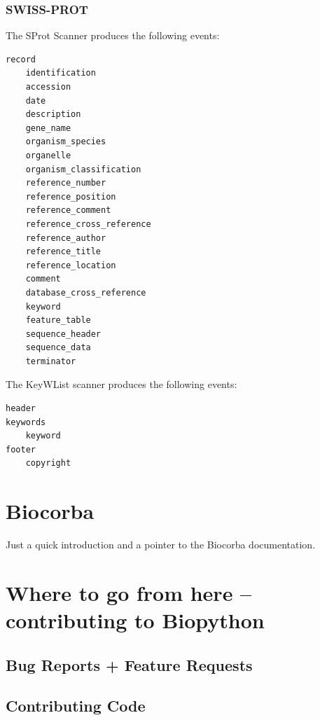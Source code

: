 \documentclass{article}
\begin{document}
\subsubsection{SWISS-PROT}
The SProt Scanner produces the following events:
\begin{verbatim}
record
    identification
    accession
    date
    description
    gene_name
    organism_species
    organelle
    organism_classification
    reference_number
    reference_position
    reference_comment
    reference_cross_reference
    reference_author
    reference_title
    reference_location
    comment
    database_cross_reference
    keyword
    feature_table
    sequence_header
    sequence_data
    terminator
\end{verbatim}


The KeyWList scanner produces the following events:
\begin{verbatim}
header
keywords
    keyword
footer
    copyright
\end{verbatim}

\section{Biocorba}

Just a quick introduction and a pointer to the
Biocorba documentation.

\section{Where to go from here -- contributing to Biopython}

\subsection{Bug Reports + Feature Requests}

\subsection{Contributing Code}
\end{document}
